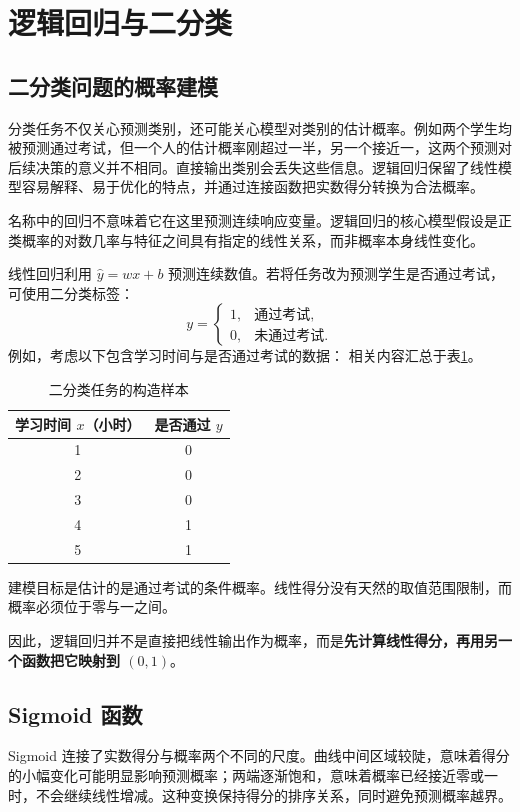 \section{逻辑回归与二分类}\label{ch:logistic}

\subsection{二分类问题的概率建模}

分类任务不仅关心预测类别，还可能关心模型对类别的估计概率。例如两个学生均被预测通过考试，但一个人的估计概率刚超过一半，另一个接近一，这两个预测对后续决策的意义并不相同。直接输出类别会丢失这些信息。逻辑回归保留了线性模型容易解释、易于优化的特点，并通过连接函数把实数得分转换为合法概率。

名称中的回归不意味着它在这里预测连续响应变量。逻辑回归的核心模型假设是正类概率的对数几率与特征之间具有指定的线性关系，而非概率本身线性变化。

线性回归利用 $\hat y=wx+b$ 预测连续数值。若将任务改为预测学生是否通过考试，可使用二分类标签：
\[
y=\begin{cases}1,&\text{通过考试},\\0,&\text{未通过考试}.\end{cases}
\]
例如，考虑以下包含学习时间与是否通过考试的数据：
相关内容汇总于表\ref{tab:logistic-samples}。
\begin{table}[htbp]\centering
\caption{二分类任务的构造样本}\label{tab:logistic-samples}
\begin{tabular}{cc}\toprule
学习时间 $x$（小时）&是否通过 $y$\\\midrule
1&0\\2&0\\3&0\\4&1\\5&1\\\bottomrule
\end{tabular}
\end{table}
建模目标是估计的是通过考试的条件概率。线性得分没有天然的取值范围限制，而概率必须位于零与一之间。

因此，逻辑回归并不是直接把线性输出作为概率，而是\textbf{先计算线性得分，再用另一个函数把它映射到 $(0,1)$}。

\subsection{Sigmoid 函数}

Sigmoid 连接了实数得分与概率两个不同的尺度。曲线中间区域较陡，意味着得分的小幅变化可能明显影响预测概率；两端逐渐饱和，意味着概率已经接近零或一时，不会继续线性增减。这种变换保持得分的排序关系，同时避免预测概率越界。

